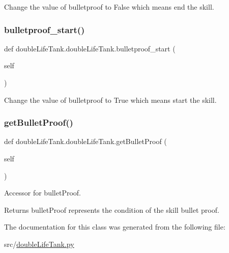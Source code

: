 Change the value of bulletproof to False which means end the skill. 

\mbox{\label{classdouble_life_tank_1_1double_life_tank_a31d43e85cd2c5b01d0877dbbeca866a5}} 
\subsubsection{\texorpdfstring{bulletproof\_start()}{bulletproof\_start()}}
{\footnotesize\ttfamily def double\+Life\+Tank.\+double\+Life\+Tank.\+bulletproof\+\_\+start (\begin{DoxyParamCaption}\item[{}]{self }\end{DoxyParamCaption})}



Change the value of bulletproof to True which means start the skill. 

\mbox{\label{classdouble_life_tank_1_1double_life_tank_a597715fc6b108e6d5f75417913371915}} 
\subsubsection{\texorpdfstring{getBulletProof()}{getBulletProof()}}
{\footnotesize\ttfamily def double\+Life\+Tank.\+double\+Life\+Tank.\+get\+Bullet\+Proof (\begin{DoxyParamCaption}\item[{}]{self }\end{DoxyParamCaption})}



Accessor for bullet\+Proof. 

\begin{DoxyReturn}{Returns}
bullet\+Proof represents the condition of the skill bullet proof. 
\end{DoxyReturn}


The documentation for this class was generated from the following file\+:\begin{DoxyCompactItemize}
\item 
src/\mbox{\hyperlink{double_life_tank_8py}{double\+Life\+Tank.\+py}}\end{DoxyCompactItemize}
